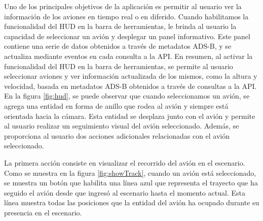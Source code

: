 \documentclass[a4paper, 11pt]{book}
\begin{document}
Uno de los principales objetivos de la aplicación es permitir al usuario ver la información de los aviones en tiempo real o en diferido. Cuando habilitamos la funcionalidad del \textsc{\gls{HUD}} en la barra de herramientas, le brinda al usuario la capacidad de seleccionar un avión y desplegar un panel informativo. Este panel contiene una serie de datos obtenidos a través de metadatos \textsc{ADS-B}, y se actualiza mediante eventos en cada consulta a la \textsc{API}.
En resumen, al activar la funcionalidad del \textsc{\gls{HUD}} en la barra de herramientas, se permite al usuario seleccionar aviones y ver información actualizada de los mismos, como la altura y velocidad, basada en metadatos \textsc{ADS-B} obtenidos a través de consultas a la \textsc{API}.
En la figura \ref{fig:hud}, se puede observar que cuando seleccionamos un avión, se agrega una entidad en forma de anillo que rodea al avión y siempre está orientada hacia la cámara. Esta entidad se desplaza junto con el avión y permite al usuario realizar un seguimiento visual del avión seleccionado. Además, se proporciona al usuario dos acciones adicionales relacionadas con el avión seleccionado.

La primera acción consiste en visualizar el recorrido del avión en el escenario. Como se muestra en la figura \ref{fig:showTrack}, cuando un avión está seleccionado, se muestra un botón que habilita una línea azul que representa el trayecto que ha seguido el avión desde que ingresó al escenario hasta el momento actual. Esta línea muestra todas las posiciones que la entidad del avión ha ocupado durante su presencia en el escenario.
\end{document}
